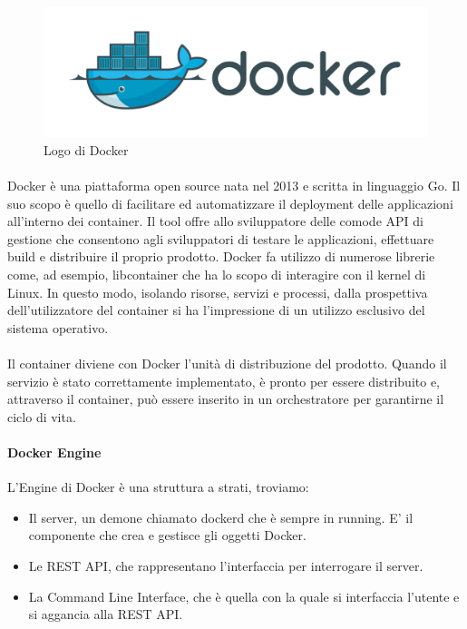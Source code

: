 \begin{figure}[h!]
	\centering
	\includegraphics[width=\textwidth,keepaspectratio=true]{capitoli/imgs/docker.png}
	\caption{Logo di Docker}
\end{figure}

\paragraph{}
Docker è una piattaforma open source nata nel 2013 e scritta in linguaggio Go. Il suo scopo è quello di facilitare ed automatizzare il deployment delle applicazioni all'interno dei container. Il tool offre allo sviluppatore delle comode API di gestione che consentono agli sviluppatori di testare le applicazioni, effettuare build e distribuire il proprio prodotto. Docker fa utilizzo di numerose librerie come, ad esempio, libcontainer che ha lo scopo di interagire con il kernel di Linux.  In questo modo, isolando risorse, servizi e processi, dalla prospettiva dell'utilizzatore del container si ha l'impressione di un utilizzo esclusivo del sistema operativo.

\paragraph{}
Il container diviene con Docker l'unità di distribuzione del prodotto. Quando il servizio è stato correttamente implementato, è pronto per essere distribuito e, attraverso il container, può essere inserito in un orchestratore per garantirne il ciclo di vita.

\paragraph{Docker Engine}
L'Engine di Docker è una struttura a strati, troviamo:
\begin{itemize}
	\item Il server, un demone chiamato dockerd che è sempre in running. E' il componente che crea e gestisce gli oggetti Docker.
	\item Le REST API, che rappresentano l'interfaccia per interrogare il server.
	\item La Command Line Interface, che è quella con la quale si interfaccia l'utente e si aggancia alla REST API.
\end{itemize}


